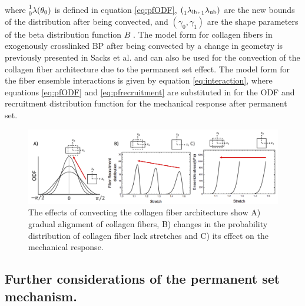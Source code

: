 where $\prescript{1}{0}{\lambda(\theta_0)}$ is defined in equation \ref{eq:pfODF}, $(\prescript{}{1}{\lambda}_\mathrm{lb},\prescript{}{1}{\lambda}_\mathrm{ub})$ are the new bounds of the distribution after being convected, and $(\gamma_0,\gamma_1)$ are the shape parameters of the beta distribution function $B$ .
The model form for collagen fibers in exogenously crosslinked BP after being convected by a change in geometry is previously presented in Sacks et al. \cite{sacks_novel_2016} and can also be used for the convection of the collagen fiber architecture due to the permanent set effect. 
The model form for the fiber ensemble interactions is given by equation \ref{eq:interaction}, where equations \ref{eq:pfODF} and \ref{eq:pfrecruitment} are substituted in for the ODF and recruitment distribution function for the mechanical response after permanent set.


\begin{figure}[hbt]
\centering
\centerline{\includegraphics[width=\textwidth]{Images/chapter4/figure10}}
\caption{The effects of convecting the collagen fiber architecture show A) gradual alignment of collagen fibers, B) changes in the probability distribution of collagen fiber lack stretches and C) its effect on the mechanical response.}
\label{fig:effectsofconvection}
\end{figure}




\subsection{Further considerations of the permanent set mechanism.}

